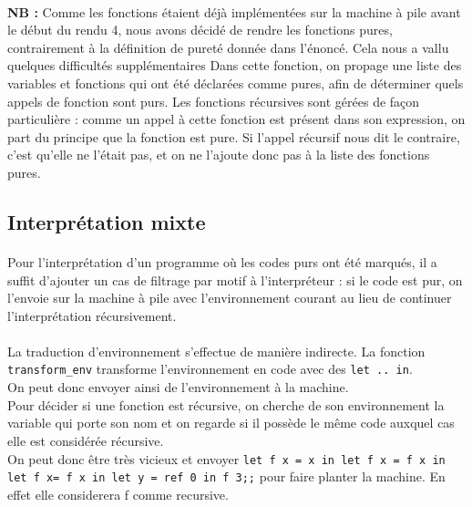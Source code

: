 \paragraph{} \textbf{NB :} Comme les fonctions étaient déjà implémentées sur la machine à pile avant le début du rendu 4, nous avons décidé de rendre les fonctions pures, contrairement à la définition de pureté donnée dans l'énoncé. Cela nous a vallu quelques difficultés supplémentaires
Dans cette fonction, on propage une liste des variables et fonctions qui ont été déclarées comme pures, afin de déterminer quels appels de fonction sont purs. Les fonctions récursives sont gérées de façon particulière : comme un appel à cette fonction est présent dans son expression, on part du principe que la fonction est pure. Si l'appel récursif nous dit le contraire, c'est qu'elle ne l'était pas, et on ne l'ajoute donc pas à la liste des fonctions pures.

\subsection{Interprétation mixte}

\paragraph{} Pour l'interprétation d'un programme où les codes purs ont été marqués, il a suffit d'ajouter un cas de filtrage par motif à l'interpréteur : si le code est pur, on l'envoie sur la machine à pile avec l'environnement courant au lieu de continuer l'interprétation récursivement.

\paragraph{} La traduction d'environnement s'effectue de manière indirecte. La fonction \texttt{transform\_env} transforme l'environnement en code avec des \texttt{let .. in}. \\
On peut donc envoyer ainsi de l'environnement à la machine.\\
Pour décider si une fonction est récursive, on cherche de son environnement la variable qui porte son nom et on regarde si il possède le même code auxquel cas elle est considérée récursive.\\ 
On peut donc être très vicieux et envoyer \texttt{let f x = x in let f x = f x in let f x= f x in let y = ref 0 in f 3;;} pour faire planter la machine. En effet elle considerera f comme recursive.

